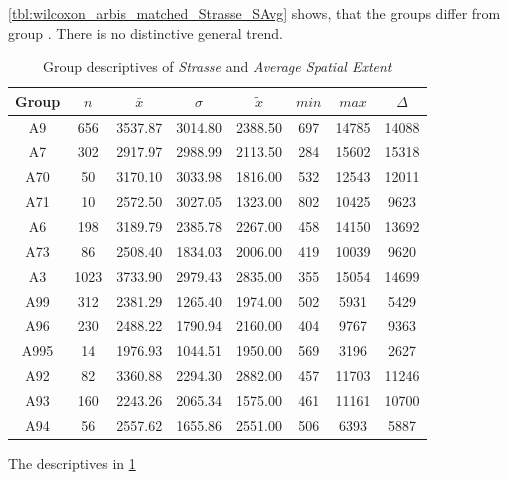 \cref{tbl:wilcoxon_arbis_matched_Strasse_SAvg} shows, that the groups  differ from group . There is no distinctive general trend.
\begin{table}[ht!]
	\tiny
	\centering
	\begin{tabular}{c|c|c|c|c|c|c|c}
		\toprule
		Group & $n$ & $\bar{x}$ & $\sigma$ & $\tilde{x}$ & $min$ & $max$ & $\Delta$ \\
		\midrule
		A9   & 656  & 3537.87 & 3014.80 & 2388.50 & 697 & 14785 & 14088 \\ 
		A7   & 302  & 2917.97 & 2988.99 & 2113.50 & 284 & 15602 & 15318 \\ 
		A70  & 50   & 3170.10 & 3033.98 & 1816.00 & 532 & 12543 & 12011 \\ 
		A71  & 10   & 2572.50 & 3027.05 & 1323.00 & 802 & 10425 & 9623  \\ 
		A6   & 198  & 3189.79 & 2385.78 & 2267.00 & 458 & 14150 & 13692 \\ 
		A73  & 86   & 2508.40 & 1834.03 & 2006.00 & 419 & 10039 & 9620  \\ 
		A3   & 1023 & 3733.90 & 2979.43 & 2835.00 & 355 & 15054 & 14699 \\ 
		A99  & 312  & 2381.29 & 1265.40 & 1974.00 & 502 & 5931  & 5429  \\ 
		A96  & 230  & 2488.22 & 1790.94 & 2160.00 & 404 & 9767  & 9363  \\ 
		A995 & 14   & 1976.93 & 1044.51 & 1950.00 & 569 & 3196  & 2627  \\ 
		A92  & 82   & 3360.88 & 2294.30 & 2882.00 & 457 & 11703 & 11246 \\ 
		A93  & 160  & 2243.26 & 2065.34 & 1575.00 & 461 & 11161 & 10700 \\  
		A94  & 56   & 2557.62 & 1655.86 & 2551.00 & 506 & 6393  & 5887  \\ 
		\bottomrule
	\end{tabular}
	\caption{Group descriptives of \textit{Strasse} and \textit{Average Spatial Extent}}
	\label{tbl:descriptives_arbis_matched_Strasse_SAvg}
\end{table}
The descriptives in \cref{tbl:descriptives_arbis_matched_Strasse_SAvg}

